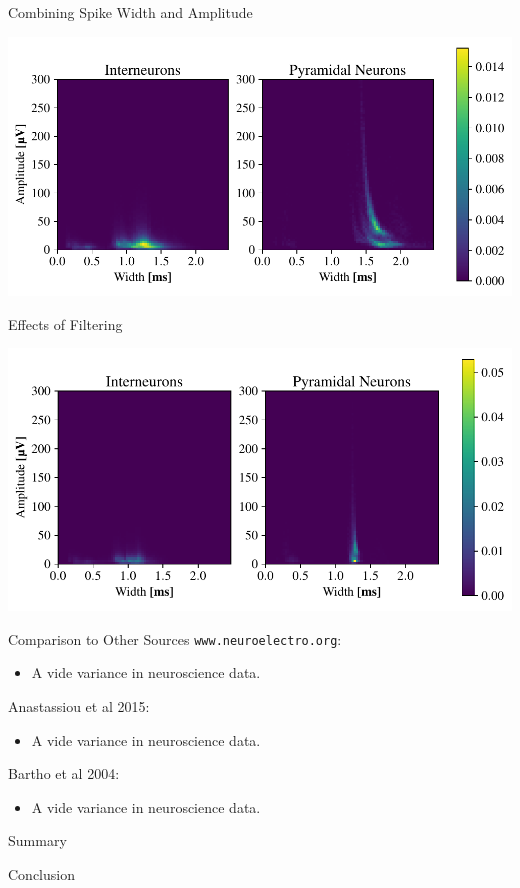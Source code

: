 \documentclass[aspectratio=169]{beamer}
\begin{document}
\begin{frame}{Combining Spike Width and Amplitude}
    \begin{center}
        \includegraphics[width=\textwidth]{images/int_pyr_hist.pdf}
    \end{center}
\end{frame}

\begin{frame}{Effects of Filtering}
    \begin{center}
        \includegraphics[width=\textwidth]{images/int_pyr_hist_filt.pdf}
    \end{center}
\end{frame}

\begin{frame}[fragile]{Comparison to Other Sources}
    \verb+www.neuroelectro.org+:
    \begin{itemize}
        \item A vide variance in neuroscience data.
    \end{itemize}
    Anastassiou et al 2015:
    \begin{itemize}
        \item A vide variance in neuroscience data.
    \end{itemize}
    Bartho et al 2004:
    \begin{itemize}
        \item A vide variance in neuroscience data.
    \end{itemize}
\end{frame}

\begin{frame}{Summary}
\end{frame}

\begin{frame}{Conclusion}
\end{frame}
\end{document}
